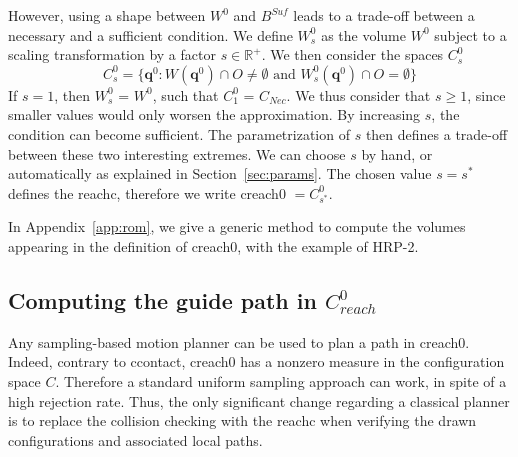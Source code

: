 However, using a shape between $W^0$ and $B^{Suf}$ leads to a trade-off between a necessary and a sufficient condition. We define $W^0_s$ as the volume $W^0$ subject to a scaling transformation by a factor $s \in \mathbb{R}^+$.
%
We then consider the spaces $C_{s}^0$
 \begin{equation}
C^0_s = \{ \mathbf{q}^0 : W(\mathbf{q}^{0}) \cap O \neq \emptyset \text{ and } W^0_s(\mathbf{q}^{0}) \cap O = \emptyset \} %
\end{equation}
%
If $s=1$, then $W^0_s$ = $W^0$, such that $C_1^0$ = $C_{Nec}$. We thus consider that $s \geq 1$, since smaller values would only worsen the approximation.
By increasing $s$, the condition can become sufficient.
The parametrization of $s$ then defines a trade-off between these two interesting extremes. 
We can choose $s$ by hand, or automatically as explained in Section~\ref{sec:params}.
The chosen value $s=s^*$ defines the \gls{reachc}, therefore we write \gls{creach0} $= C^0_{s^*}$.

In Appendix~\ref{app:rom}, we give a generic method to compute the volumes appearing in the definition of \gls{creach0}, with the example of HRP-2.

\subsection{Computing the guide path in $C_{reach}^0$}
Any sampling-based motion planner can be used to plan a path in \gls{creach0}. 
Indeed, contrary to \gls{ccontact}, \gls{creach0} has a nonzero measure in the configuration space $C$. Therefore a standard uniform sampling approach
can work, in spite of a high rejection rate. 
Thus, the only significant change regarding a classical planner is to replace the collision checking with the \gls{reachc} when verifying
the drawn configurations and associated local paths.

